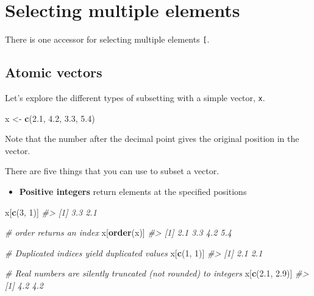 \documentclass[]{book}
\newenvironment{Shaded}{\begin{snugshade}}{\end{snugshade}}
\newcommand{\CommentTok}[1]{\textcolor[rgb]{0.56,0.35,0.01}{\textit{#1}}}
\newcommand{\DecValTok}[1]{\textcolor[rgb]{0.00,0.00,0.81}{#1}}
\newcommand{\FloatTok}[1]{\textcolor[rgb]{0.00,0.00,0.81}{#1}}
\newcommand{\KeywordTok}[1]{\textcolor[rgb]{0.13,0.29,0.53}{\textbf{#1}}}
\newcommand{\NormalTok}[1]{#1}
\newcommand{\StringTok}[1]{\textcolor[rgb]{0.31,0.60,0.02}{#1}}
\providecommand{\tightlist}{%
  \setlength{\itemsep}{0pt}\setlength{\parskip}{0pt}}
\theoremstyle{definition}
\theoremstyle{definition}
\theoremstyle{definition}
\theoremstyle{remark}
\begin{document}
\hypertarget{selecting-multiple-elements}{%
\section{Selecting multiple
elements}\label{selecting-multiple-elements}}

There is one accessor for selecting multiple elements \texttt{{[}}.

\hypertarget{atomic-vectors-1}{%
\subsection{Atomic vectors}\label{atomic-vectors-1}}

Let's explore the different types of subsetting with a simple vector,
\texttt{x}.

\begin{Shaded}
\begin{Highlighting}[]
\NormalTok{x <-}\StringTok{ }\KeywordTok{c}\NormalTok{(}\FloatTok{2.1}\NormalTok{, }\FloatTok{4.2}\NormalTok{, }\FloatTok{3.3}\NormalTok{, }\FloatTok{5.4}\NormalTok{)}
\end{Highlighting}
\end{Shaded}

Note that the number after the decimal point gives the original position
in the vector.

There are five things that you can use to subset a vector.

\begin{itemize}
\tightlist
\item
  \textbf{Positive integers} return elements at the specified positions
\end{itemize}

\begin{Shaded}
\begin{Highlighting}[]
\NormalTok{x[}\KeywordTok{c}\NormalTok{(}\DecValTok{3}\NormalTok{, }\DecValTok{1}\NormalTok{)]}
\CommentTok{#> [1] 3.3 2.1}

\CommentTok{# order returns an index}
\NormalTok{x[}\KeywordTok{order}\NormalTok{(x)]}
\CommentTok{#> [1] 2.1 3.3 4.2 5.4}

\CommentTok{# Duplicated indices yield duplicated values}
\NormalTok{x[}\KeywordTok{c}\NormalTok{(}\DecValTok{1}\NormalTok{, }\DecValTok{1}\NormalTok{)]}
\CommentTok{#> [1] 2.1 2.1}

\CommentTok{# Real numbers are silently truncated (not rounded) to integers}
\NormalTok{x[}\KeywordTok{c}\NormalTok{(}\FloatTok{2.1}\NormalTok{, }\FloatTok{2.9}\NormalTok{)]}
\CommentTok{#> [1] 4.2 4.2}
\end{Highlighting}
\end{Shaded}
\end{document}

